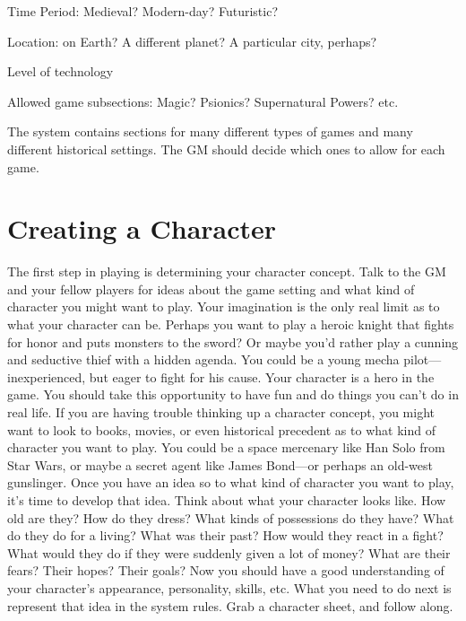 \documentclass[twoside]{book}
\begin{document}
                 Time Period: Medieval? Modern-day? Futuristic?
                 
              
              
                  Location: on Earth? A different planet? A
                 particular city, perhaps? 
              
              
                Level of technology   
              
              
                  Allowed game subsections: Magic? Psionics?
                 Supernatural Powers? etc. 
              
           The \APATHY{}  system contains sections for many
            different types of games and many different historical
            settings. The GM should decide which ones to allow for each
            game.
          
\section{Creating a Character}
     The first step in playing \APATHY{}  is determining
            your character concept. Talk to the GM and your fellow
            players for ideas about the game setting and what kind of
            character you might want to play. Your imagination is the
            only real limit as to what your character can be. Perhaps you
            want to play a heroic knight that fights for honor and puts
            monsters to the sword? Or maybe you’d rather play a
            cunning and seductive thief with a hidden agenda. You could
            be a young mecha pilot—inexperienced, but eager to
            fight for his cause. Your character is a hero in the game.
            You should take this opportunity to have fun and do things
            you can’t do in real life.
           If you are having trouble thinking up a character
             concept, you might want to look to books, movies, or even
             historical precedent as to what kind of character you want
             to play. You could be a space mercenary like Han Solo from
             Star Wars, or maybe a secret agent like James Bond—or
             perhaps an old-west gunslinger.  Once you have an idea so to what kind of character you
             want to play, it’s time to develop that idea. Think
             about what your character looks like. How old are they? How
             do they dress? What kinds of possessions do they have? What
             do they do for a living? What was their past? How would they
             react in a fight? What would they do if they were suddenly
             given a lot of money? What are their fears? Their hopes?
             Their goals?  Now you should have a good understanding of your
            character’s appearance, personality, skills, etc. What
            you need to do next is represent that idea in the \APATHY{} 
            system rules. Grab a character sheet, and follow along.
          
\end{document}
